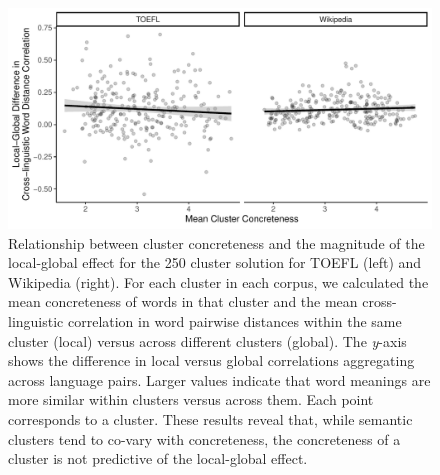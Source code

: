 \documentclass[9pt,twoside,lineno]{pnas-new}
\begin{document}
\begin{figure}[h]
\centering
     \includegraphics[width = 6.3in]{suppfigs/local_global_concreteness_semantics_plot.pdf}
         \caption{Relationship between cluster concreteness and the magnitude of the local-global effect for the 250 cluster solution for TOEFL (left) and Wikipedia (right). For each cluster in each corpus, we calculated the mean concreteness of words in that cluster and the mean cross-linguistic correlation in word pairwise distances within the same cluster (local) versus across different clusters (global). The {\it y}-axis shows the difference in local versus global correlations  aggregating across language pairs. Larger values indicate that word meanings are more similar within clusters versus across them. Each point corresponds to a cluster. These results reveal that, while semantic clusters tend to co-vary with concreteness, the concreteness of a cluster is not predictive of the local-global effect. }
\end{figure}


\pagebreak
 \clearpage
\end{document}
